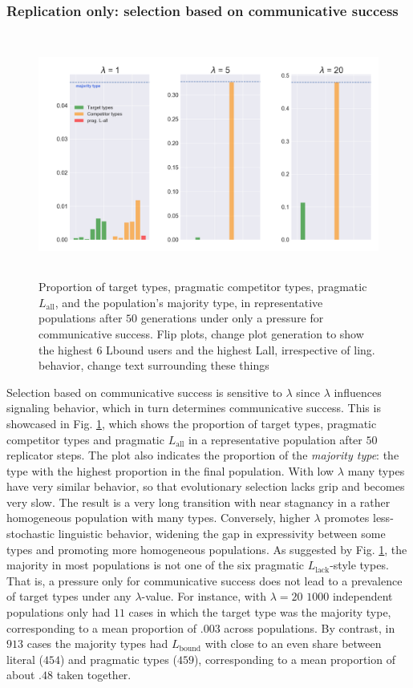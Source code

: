\documentclass[a4paper, 11pt]{article}
\theoremstyle{Satz}
\newcommand{\hl}[1]{\textcolor[rgb]{.8,.33,.0}{#1}}%
\newcommand{\mylang}[1]{\ensuremath{L_{\text{#1}}}\xspace} %
\newcommand{\Lall}{\mylang{all}}
\newcommand{\Lbound}{\mylang{bound}}
\newcommand{\Llack}{\mylang{lack}}
\begin{document}
\subsubsection{Replication only: selection based on communicative success} 

\begin{figure}[t]
\centering
\includegraphics[width=\textwidth,height=8cm, keepaspectratio]{./plots/alt-fig1-onlyr}
\caption{Proportion of target types, \hl{pragmatic} competitor types, \hl{pragmatic} $\Lall$, and the population's majority type, in representative populations after $50$ generations under only a
  pressure for communicative success. \hl{Flip plots, change plot generation to show the highest 6 Lbound users and the highest Lall, irrespective of ling. behavior, change text surrounding these things}}
\label{fig:only-R}
\end{figure}

Selection based on communicative success is sensitive to $\lambda$ since $\lambda$
influences signaling behavior, which in turn determines communicative success. This is
showcased in Fig. \ref{fig:only-R}, which shows the proportion of target types, \hl{pragmatic} competitor types and \hl{pragmatic} $\Lall$ in a representative population after $50$ replicator steps. The plot also indicates the proportion of the
\emph{majority type}: the type with the highest proportion in the final population. With
low $\lambda$ many types have very similar behavior, so that evolutionary selection lacks grip
and becomes very slow. The result is a very long transition with near stagnancy in a rather
homogeneous population with many types. Conversely, higher $\lambda$ promotes 
less-stochastic linguistic behavior, widening the gap in expressivity between some types and
promoting more homogeneous populations. As suggested by Fig. \ref{fig:only-R}, the majority
in most populations is not one of the six pragmatic $\Llack$-style types. That is, a pressure
only for communicative success does not lead to a prevalence of target types under any
$\lambda$-value. For instance, with $\lambda = 20$ $1000$ independent populations only had $11$
cases in which the target type was the majority type, corresponding to a mean proportion of
$.003$ across populations. By contrast, in $913$ cases the majority types had $\Lbound$ with
close to an even share between literal ($454$) and pragmatic types ($459$), corresponding to a
mean proportion of about $.48$ taken together.
\end{document}
